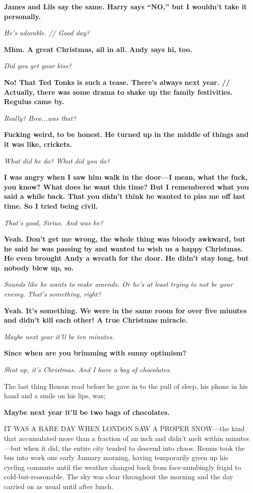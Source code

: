 \textbf{James and Lils say the same. Harry says “NO,” but I wouldn’t take it personally.}

\textit{He’s adorable. // Good day?
}

\textbf{Mhm. A great Christmas, all in all. Andy says hi, too.
}

\textit{Did you get your kiss?
}

\textbf{No! That Ted Tonks is such a tease. There’s always next year. // Actually, there was some drama to shake up the family festivities. Regulus came by.}

\textit{Really? How...was that?
}

\textbf{Fucking weird, to be honest. He turned up in the middle of things and it was like, crickets.
}

\textit{What did he do? What did you do?
}

\textbf{I was angry when I saw him walk in the door—I mean, what the fuck, you know? What does he want this time? But I remembered what you said a while back. That you didn’t think he wanted to piss me off last time. So I tried being civil.}

\textit{That’s good, Sirius. And was he?
}

\textbf{Yeah. Don’t get me wrong, the whole thing was bloody awkward, but he said he was passing by and wanted to wish us a happy Christmas. He even brought Andy a wreath for the door. He didn’t stay long, but nobody blew up, so.
}

\textit{Sounds like he wants to make amends. Or he’s at least trying to not be your enemy. That’s something, right?
}

\textbf{Yeah. It’s something. We were in the same room for over five minutes and didn’t kill each other! A true Christmas miracle.
}

\textit{Maybe next year it’ll be ten minutes.
}

\textbf{Since when are you brimming with sunny optimism?
}

\textit{Shut up, it’s Christmas. And I have a bag of chocolates.
}

The last thing Remus read before he gave in to the pull of sleep, his phone in his hand and a smile on his lips, was;

\textbf{Maybe next year it’ll be two bags of chocolates.
}
\newpage


IT WAS A RARE DAY WHEN LONDON SAW A PROPER SNOW—the kind that accumulated more than a fraction of an inch and didn’t melt within minutes—but when it did, the entire city tended to descend into chaos. Remus took the bus into work one early January morning, having temporarily given up his cycling commute until the weather changed back from face-numbingly frigid to cold-but-reasonable. The sky was clear throughout the morning and the day carried on as usual until after lunch.

